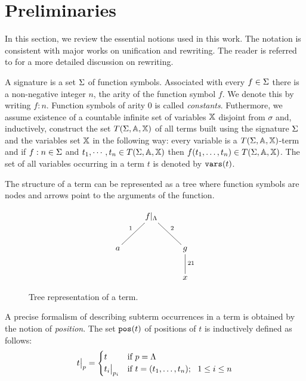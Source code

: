\section{Preliminaries}
In this section, we review the essential notions used in this work. The notation is consistent with major works on unification and rewriting. The reader is referred to \cite{bezem2003term} for a more detailed discussion on rewriting.

A signature is a set $\Sigma$ of function symbols. Associated with every $f \in \Sigma$ there is a non-negative integer $n$, the arity of the function symbol $f$. We denote this by writing $f:n$. Function symbols of arity $0$ is called \textit{constants}. Futhermore, we assume existence of a countable infinite set of variables $\mathbb{X}$ disjoint from $\sigma$ and, inductively, construct the set $T(\Sigma,\mathbb{A},\mathbb{X})$ of all terms built using the signature $\Sigma$ and the variables set $\mathbb{X}$ in the following way: every variable is a $T(\Sigma,\mathbb{A},\mathbb{X})$-term and if $f:n \in \Sigma$ and $t_1, \cdots, t_n \in T(\Sigma,\mathbb{A},\mathbb{X})$ then $f(t_1, \dots, t_n) \in T(\Sigma,\mathbb{A},\mathbb{X})$. The set of all variables occurring in a term $t$ is denoted by $\mathtt{vars}(t)$.

The structure of a term can be represented as a tree where function symbols are nodes and arrows point to the arguments of the function.
\begin{figure}[!ht]
	\begin{displaymath}
		\xymatrix{
		&f|_\Lambda \ar@{-}^2[dr]\ar@{-}_1[dl]&\\
		a  & & g \ar@{-}^{21}[d] \\
		& &x
		}
	\end{displaymath}
	\caption{Tree representation of a term.}
	\label{figure:tree-representation-of-a-term}
\end{figure}
A precise formalism of describing subterm occurrences in a term is obtained by the notion of \textit{position}. The set $\mathtt{pos}(t)$ of positions of $t$ is inductively defined as follows:
\begin{displaymath}
    \restr{t}{p} =
	\begin{cases}
		t                & \mbox{if } p = \Lambda                               \\
		\restr{t_i}{p_i} & \mbox{if } t = (t_1,\dots, t_n); \ \ 1 \leq i \leq n
	\end{cases}
\end{displaymath}

